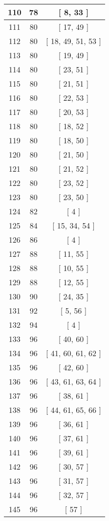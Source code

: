\begin{center}
\begin{longtable}[H]{|| c c c ||}
\hline
110 & 78 & [ 8, 33 ] \\ 
\hline
111 & 80 & [ 17, 49 ] \\ 
\hline
112 & 80 & [ 18, 49, 51, 53 ] \\ 
\hline
113 & 80 & [ 19, 49 ] \\ 
\hline
114 & 80 & [ 23, 51 ] \\ 
\hline
115 & 80 & [ 21, 51 ] \\ 
\hline
116 & 80 & [ 22, 53 ] \\ 
\hline
117 & 80 & [ 20, 53 ] \\ 
\hline
118 & 80 & [ 18, 52 ] \\ 
\hline
119 & 80 & [ 18, 50 ] \\ 
\hline
120 & 80 & [ 21, 50 ] \\ 
\hline
121 & 80 & [ 21, 52 ] \\ 
\hline
122 & 80 & [ 23, 52 ] \\ 
\hline
123 & 80 & [ 23, 50 ] \\ 
\hline
124 & 82 & [ 4 ] \\ 
\hline
125 & 84 & [ 15, 34, 54 ] \\ 
\hline
126 & 86 & [ 4 ] \\ 
\hline
127 & 88 & [ 11, 55 ] \\ 
\hline
128 & 88 & [ 10, 55 ] \\ 
\hline
129 & 88 & [ 12, 55 ] \\ 
\hline
130 & 90 & [ 24, 35 ] \\ 
\hline
131 & 92 & [ 5, 56 ] \\ 
\hline
132 & 94 & [ 4 ] \\ 
\hline
133 & 96 & [ 40, 60 ] \\ 
\hline
134 & 96 & [ 41, 60, 61, 62 ] \\ 
\hline
135 & 96 & [ 42, 60 ] \\ 
\hline
136 & 96 & [ 43, 61, 63, 64 ] \\ 
\hline
137 & 96 & [ 38, 61 ] \\ 
\hline
138 & 96 & [ 44, 61, 65, 66 ] \\ 
\hline
139 & 96 & [ 36, 61 ] \\ 
\hline
140 & 96 & [ 37, 61 ] \\ 
\hline
141 & 96 & [ 39, 61 ] \\ 
\hline
142 & 96 & [ 30, 57 ] \\ 
\hline
143 & 96 & [ 31, 57 ] \\ 
\hline
144 & 96 & [ 32, 57 ] \\ 
\hline
145 & 96 & [ 57 ] \\ 

\end{longtable}
\end{center}
